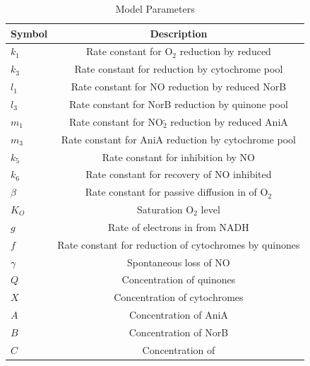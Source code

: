 \begin{table}[ht]
\begin{center}
\begin{tabular}{l c}
\toprule
\textbf{Symbol} & \textbf{Description}\\
\midrule
$k_1$ & Rate constant for O$_{\textrm{2}}$ reduction by reduced \cbbthree{}\\
$k_3$ & Rate constant for \cbbthree{} reduction by cytochrome pool\\
$l_1$ & Rate constant for NO reduction by reduced NorB\\
$l_3$ & Rate constant for NorB reduction by quinone pool\\
$m_1$ & Rate constant for NO$_{\textrm{2}}^{\textrm{-}}$ reduction by reduced AniA\\
$m_3$ & Rate constant for AniA reduction by cytochrome pool\\
$k_5$ & Rate constant for \cbbthree{} inhibition by NO\\
$k_6$ & Rate constant for recovery of NO inhibited \cbbthree{}\\
$\beta$ & Rate constant for passive diffusion in of O$_{\textrm{2}}$\\
$K_O$ & Saturation O$_{\textrm{2}}$ level\\
$g$ & Rate of electrons in from NADH\\
$f$ & Rate constant for reduction of cytochromes by quinones\\
$\gamma$ & Spontaneous loss of NO\\
$Q$ & Concentration of quinones\\
$X$ & Concentration of cytochromes\\
$A$ & Concentration of AniA\\
$B$ & Concentration of NorB\\
$C$ & Concentration of \cbbthree{}\\
\bottomrule
\end{tabular}
\caption{Model Parameters
\label{ps}}
\end{center}
\end{table}